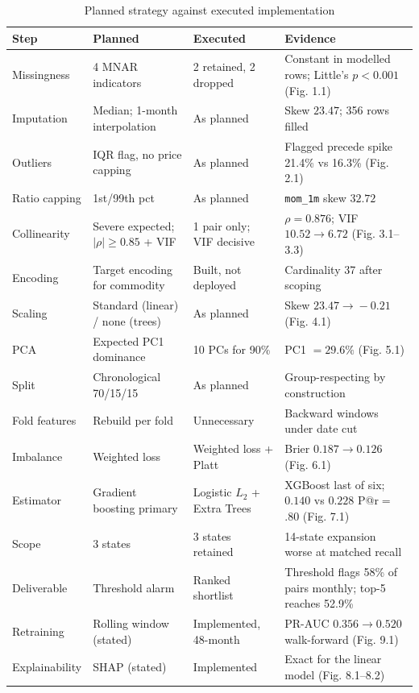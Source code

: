 \documentclass[conference]{IEEEtran}
\begin{document}
\begin{table}[!t]
\caption{Planned strategy against executed implementation}
\begin{center}
\small
\begin{tabular}{@{}p{2.6cm}p{3.8cm}p{3.8cm}p{6.2cm}@{}}
\toprule
\textbf{Step} & \textbf{Planned} & \textbf{Executed} & \textbf{Evidence} \\
\midrule
Missingness
& 4 MNAR indicators
& 2 retained, 2 dropped
& Constant in modelled rows; Little's $p<0.001$ (Fig. 1.1) \\
\addlinespace
Imputation
& Median; 1-month interpolation
& As planned
& Skew $23.47$; 356 rows filled \\
\addlinespace
Outliers
& IQR flag, no price capping
& As planned
& Flagged precede spike 21.4\% vs 16.3\% (Fig. 2.1) \\
\addlinespace
Ratio capping
& 1st/99th pct
& As planned
& \texttt{mom\_1m} skew $32.72$ \\
\addlinespace
Collinearity
& Severe expected; $|\rho|\!\geq\!0.85$ + VIF
& 1 pair only; VIF decisive
& $\rho=0.876$; VIF $10.52\!\to\!6.72$ (Fig. 3.1--3.3) \\
\addlinespace
Encoding
& Target encoding for commodity
& Built, not deployed
& Cardinality 37 after scoping \\
\addlinespace
Scaling
& Standard (linear) / none (trees)
& As planned
& Skew $23.47\!\to\!-0.21$ (Fig. 4.1) \\
\addlinespace
PCA
& Expected PC1 dominance
& 10 PCs for 90\%
& PC1 $=29.6\%$ (Fig. 5.1) \\
\addlinespace
Split
& Chronological 70/15/15
& As planned
& Group-respecting by construction \\
\addlinespace
Fold features
& Rebuild per fold
& Unnecessary
& Backward windows under date cut \\
\addlinespace
Imbalance
& Weighted loss
& Weighted loss + Platt
& Brier $0.187\!\to\!0.126$ (Fig. 6.1) \\
\addlinespace
Estimator
& Gradient boosting primary
& Logistic $L_2$ + Extra Trees
& XGBoost last of six; $0.140$ vs $0.228$ P@r$=$.80 (Fig. 7.1) \\
\addlinespace
Scope
& 3 states
& 3 states retained
& 14-state expansion worse at matched recall \\
\addlinespace
Deliverable
& Threshold alarm
& Ranked shortlist
& Threshold flags 58\% of pairs monthly; top-5 reaches 52.9\% \\
\addlinespace
Retraining
& Rolling window (stated)
& Implemented, 48-month
& PR-AUC $0.356\!\to\!0.520$ walk-forward (Fig. 9.1) \\
\addlinespace
Explainability
& SHAP (stated)
& Implemented
& Exact for the linear model (Fig. 8.1--8.2) \\
\bottomrule
\end{tabular}
\label{tab:decisionlog}
\end{center}
\end{table}
\end{document}
